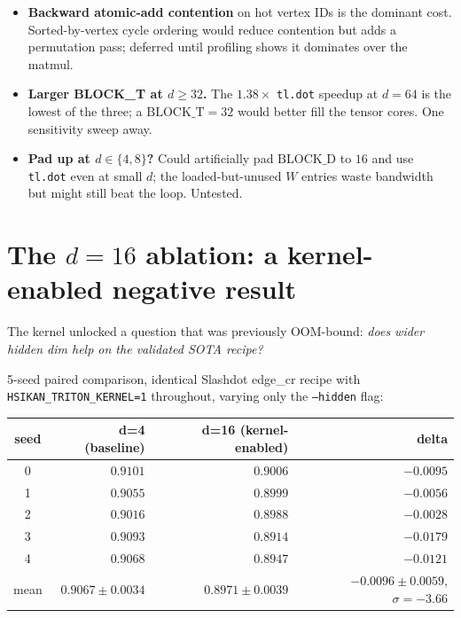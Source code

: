 \documentclass[11pt,a4paper]{article}
\begin{document}
\begin{itemize}[leftmargin=*]
\item \textbf{Backward atomic-add contention} on hot vertex IDs is
the dominant cost. Sorted-by-vertex cycle ordering would reduce
contention but adds a permutation pass; deferred until profiling
shows it dominates over the matmul.
\item \textbf{Larger BLOCK\_T at $d \ge 32$.} The $1.38\times$
\texttt{tl.dot} speedup at $d{=}64$ is the lowest of the three; a
$\mathrm{BLOCK\_T}=32$ would better fill the tensor cores. One
sensitivity sweep away.
\item \textbf{Pad up at $d \in \{4, 8\}$?} Could artificially pad
$\mathrm{BLOCK\_D}$ to $16$ and use \texttt{tl.dot} even at small $d$;
the loaded-but-unused $W$ entries waste bandwidth but might still
beat the loop. Untested.
\end{itemize}

\section{The $d{=}16$ ablation: a kernel-enabled negative result}

The kernel unlocked a question that was previously OOM-bound:
\emph{does wider hidden dim help on the validated SOTA recipe?}

5-seed paired comparison, identical Slashdot edge\_cr recipe with
\texttt{HSIKAN\_TRITON\_KERNEL=1} throughout, varying only the
\texttt{--hidden} flag:

\begin{center}\small
\begin{tabular}{c r r r}
\toprule
\textbf{seed} & \textbf{d=4 (baseline)} & \textbf{d=16 (kernel-enabled)} & \textbf{delta} \\
\midrule
0 & $0.9101$ & $0.9006$ & $-0.0095$ \\
1 & $0.9055$ & $0.8999$ & $-0.0056$ \\
2 & $0.9016$ & $0.8988$ & $-0.0028$ \\
3 & $0.9093$ & $0.8914$ & $\mathbf{-0.0179}$ \\
4 & $0.9068$ & $0.8947$ & $-0.0121$ \\
\midrule
mean & $0.9067 \pm 0.0034$ & $0.8971 \pm 0.0039$ &
$\mathbf{-0.0096 \pm 0.0059}$, $\sigma=-3.66$ \\
\bottomrule
\end{tabular}
\end{center}
\end{document}
